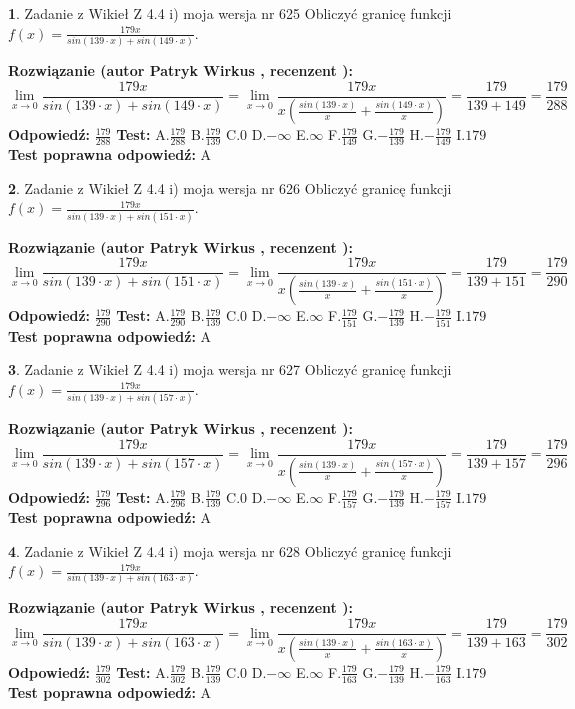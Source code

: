 \documentclass[12pt, a4paper]{article}
\theoremstyle{definition} %
\newtheorem{zad}{}
\newcommand{\zadStart}[1]{\begin{zad}#1\newline}
\newcommand{\zadStop}{\end{zad}}
\newcommand{\rozwStart}[2]{\noindent \textbf{Rozwiązanie (autor #1 , recenzent #2): }\newline}
\newcommand{\rozwStop}{\newline}
\newcommand{\odpStart}{\noindent \textbf{Odpowiedź:}\newline}
\newcommand{\odpStop}{\newline}
\newcommand{\testStart}{\noindent \textbf{Test:}\newline}
\newcommand{\testStop}{\newline}
\newcommand{\kluczStart}{\noindent \textbf{Test poprawna odpowiedź:}\newline}
\newcommand{\kluczStop}{\newline}
\begin{document}
\zadStart{Zadanie z Wikieł Z 4.4 i) moja wersja nr 625}
Obliczyć granicę funkcji $f(x)=\frac{179x}{sin(139\cdot x) +sin(149\cdot x)}$.
\zadStop
\rozwStart{Patryk Wirkus}{}
$$\lim\limits_{x\to 0}\frac{179x}{sin(139\cdot x) +sin(149\cdot x)}=\lim\limits_{x\to 0}\frac{179x}{x(\frac{sin(139\cdot x)}{x}+\frac{sin(149\cdot x)}{x})}=\frac{179}{139+149} = \frac{179}{288}$$
\rozwStop
\odpStart
$\frac{179}{288}$
\odpStop
\testStart
A.$\frac{179}{288}$
B.$\frac{179}{139}$
C.$0$
D.$-\infty$
E.$\infty$
F.$\frac{179}{149}$
G.$-\frac{179}{139}$
H.$-\frac{179}{149}$
I.$179$
\testStop
\kluczStart
A
\kluczStop



\zadStart{Zadanie z Wikieł Z 4.4 i) moja wersja nr 626}
Obliczyć granicę funkcji $f(x)=\frac{179x}{sin(139\cdot x) +sin(151\cdot x)}$.
\zadStop
\rozwStart{Patryk Wirkus}{}
$$\lim\limits_{x\to 0}\frac{179x}{sin(139\cdot x) +sin(151\cdot x)}=\lim\limits_{x\to 0}\frac{179x}{x(\frac{sin(139\cdot x)}{x}+\frac{sin(151\cdot x)}{x})}=\frac{179}{139+151} = \frac{179}{290}$$
\rozwStop
\odpStart
$\frac{179}{290}$
\odpStop
\testStart
A.$\frac{179}{290}$
B.$\frac{179}{139}$
C.$0$
D.$-\infty$
E.$\infty$
F.$\frac{179}{151}$
G.$-\frac{179}{139}$
H.$-\frac{179}{151}$
I.$179$
\testStop
\kluczStart
A
\kluczStop



\zadStart{Zadanie z Wikieł Z 4.4 i) moja wersja nr 627}
Obliczyć granicę funkcji $f(x)=\frac{179x}{sin(139\cdot x) +sin(157\cdot x)}$.
\zadStop
\rozwStart{Patryk Wirkus}{}
$$\lim\limits_{x\to 0}\frac{179x}{sin(139\cdot x) +sin(157\cdot x)}=\lim\limits_{x\to 0}\frac{179x}{x(\frac{sin(139\cdot x)}{x}+\frac{sin(157\cdot x)}{x})}=\frac{179}{139+157} = \frac{179}{296}$$
\rozwStop
\odpStart
$\frac{179}{296}$
\odpStop
\testStart
A.$\frac{179}{296}$
B.$\frac{179}{139}$
C.$0$
D.$-\infty$
E.$\infty$
F.$\frac{179}{157}$
G.$-\frac{179}{139}$
H.$-\frac{179}{157}$
I.$179$
\testStop
\kluczStart
A
\kluczStop



\zadStart{Zadanie z Wikieł Z 4.4 i) moja wersja nr 628}
Obliczyć granicę funkcji $f(x)=\frac{179x}{sin(139\cdot x) +sin(163\cdot x)}$.
\zadStop
\rozwStart{Patryk Wirkus}{}
$$\lim\limits_{x\to 0}\frac{179x}{sin(139\cdot x) +sin(163\cdot x)}=\lim\limits_{x\to 0}\frac{179x}{x(\frac{sin(139\cdot x)}{x}+\frac{sin(163\cdot x)}{x})}=\frac{179}{139+163} = \frac{179}{302}$$
\rozwStop
\odpStart
$\frac{179}{302}$
\odpStop
\testStart
A.$\frac{179}{302}$
B.$\frac{179}{139}$
C.$0$
D.$-\infty$
E.$\infty$
F.$\frac{179}{163}$
G.$-\frac{179}{139}$
H.$-\frac{179}{163}$
I.$179$
\testStop
\kluczStart
A
\kluczStop
\end{document}
